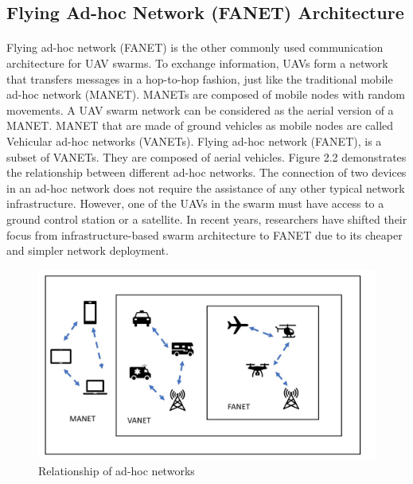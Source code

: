 \documentclass[a4paper,12pt]{report}
\begin{document}
\subsection{Flying Ad-hoc Network (FANET) Architecture}
\paragraph{}
Flying ad-hoc network (FANET) is the other commonly used communication architecture for UAV swarms. To exchange information, UAVs form a network that transfers messages in a hop-to-hop fashion, just like the traditional mobile ad-hoc network (MANET)\cite{6}. MANETs are composed of mobile nodes with random movements. A UAV swarm network can be considered as the aerial version of a MANET\cite{4}. MANET that are made of ground vehicles as mobile nodes are called Vehicular ad-hoc networks (VANETs). Flying ad-hoc network (FANET), is a subset of VANETs. They are composed of aerial vehicles. Figure 2.2 demonstrates the relationship between different ad-hoc networks. The connection of two devices in an ad-hoc network does not require the assistance of any other typical network infrastructure. However, one of the UAVs in the swarm must have access to a ground control station or a satellite\cite{doi:10.1139/juvs-2018-0009}. In recent years, researchers have shifted their focus from infrastructure-based swarm architecture to FANET due to its cheaper and simpler network deployment.  

\begin{figure}[h]
\begin{center}
\includegraphics[width=1.05\linewidth]{images/adhoc.jpg}
\caption{Relationship of ad-hoc networks}
\end{center}
\end{figure}
\end{document}
